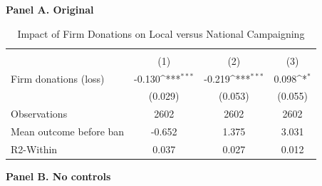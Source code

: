 \documentclass[12pt,a4paper]{article}
\begin{document}
\begin{table}[H]\centering
\footnotesize 
\setlength{\tabcolsep}{8pt} 
\renewcommand{\arraystretch}{0.95}
\caption{Impact of Firm Donations on Local versus National Campaigning}
\label{tab:don_local_nat}

\bigskip
\textbf{Panel A. Original}\\[1mm]

{
\def\sym#1{\ifmmode^{#1}\else\(^{#1}\)\fi}
\begin{tabular}{l*{3}{c}}
\hline\hline
                &&&\\\cmidrule(lr){2-2}\cmidrule(lr){3-3}\cmidrule(lr){4-4}
                &         &         &         \\
\hline
Firm donations (loss)&   -0.130\sym{***}&   -0.219\sym{***}&    0.098\sym{*}  \\
                &  (0.029)         &  (0.053)         &  (0.055)         \\
\hline
Observations    &     2602         &     2602         &     2602         \\
Mean outcome before ban&   -0.652         &    1.375         &    3.031         \\
R2-Within       &    0.037         &    0.027         &    0.012         \\
\hline\hline
\end{tabular}
}

\bigskip
\textbf{Panel B. No controls}\\[1mm]


\end{table}
\end{document}
